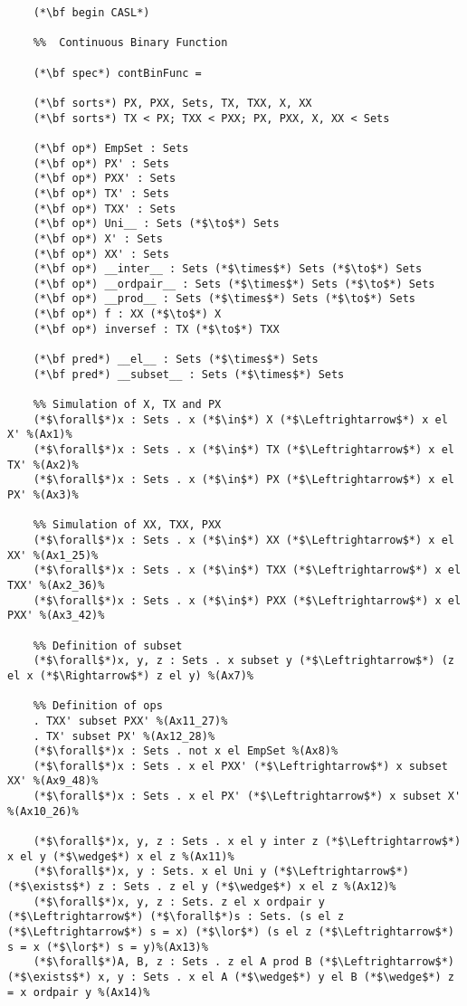 \documentclass{standalone}
\begin{document}
\begin{lstlisting}
	(*\bf begin CASL*)
	
	%%  Continuous Binary Function
	
	(*\bf spec*) contBinFunc =
	
	(*\bf sorts*) PX, PXX, Sets, TX, TXX, X, XX
	(*\bf sorts*) TX < PX; TXX < PXX; PX, PXX, X, XX < Sets
	
	(*\bf op*) EmpSet : Sets
	(*\bf op*) PX' : Sets
	(*\bf op*) PXX' : Sets
	(*\bf op*) TX' : Sets
	(*\bf op*) TXX' : Sets
	(*\bf op*) Uni__ : Sets (*$\to$*) Sets
	(*\bf op*) X' : Sets
	(*\bf op*) XX' : Sets
	(*\bf op*) __inter__ : Sets (*$\times$*) Sets (*$\to$*) Sets
	(*\bf op*) __ordpair__ : Sets (*$\times$*) Sets (*$\to$*) Sets
	(*\bf op*) __prod__ : Sets (*$\times$*) Sets (*$\to$*) Sets
	(*\bf op*) f : XX (*$\to$*) X
	(*\bf op*) inversef : TX (*$\to$*) TXX
	
	(*\bf pred*) __el__ : Sets (*$\times$*) Sets
	(*\bf pred*) __subset__ : Sets (*$\times$*) Sets
	
	%% Simulation of X, TX and PX
	(*$\forall$*)x : Sets . x (*$\in$*) X (*$\Leftrightarrow$*) x el X' %(Ax1)%
	(*$\forall$*)x : Sets . x (*$\in$*) TX (*$\Leftrightarrow$*) x el TX' %(Ax2)%
	(*$\forall$*)x : Sets . x (*$\in$*) PX (*$\Leftrightarrow$*) x el PX' %(Ax3)%
	
	%% Simulation of XX, TXX, PXX
	(*$\forall$*)x : Sets . x (*$\in$*) XX (*$\Leftrightarrow$*) x el XX' %(Ax1_25)%
	(*$\forall$*)x : Sets . x (*$\in$*) TXX (*$\Leftrightarrow$*) x el TXX' %(Ax2_36)%
	(*$\forall$*)x : Sets . x (*$\in$*) PXX (*$\Leftrightarrow$*) x el PXX' %(Ax3_42)%
	
	%% Definition of subset
	(*$\forall$*)x, y, z : Sets . x subset y (*$\Leftrightarrow$*) (z el x (*$\Rightarrow$*) z el y) %(Ax7)%
	
	%% Definition of ops
	. TXX' subset PXX' %(Ax11_27)%
	. TX' subset PX' %(Ax12_28)%
	(*$\forall$*)x : Sets . not x el EmpSet %(Ax8)%
	(*$\forall$*)x : Sets . x el PXX' (*$\Leftrightarrow$*) x subset XX' %(Ax9_48)%
	(*$\forall$*)x : Sets . x el PX' (*$\Leftrightarrow$*) x subset X' %(Ax10_26)%
	
	(*$\forall$*)x, y, z : Sets . x el y inter z (*$\Leftrightarrow$*) x el y (*$\wedge$*) x el z %(Ax11)%
	(*$\forall$*)x, y : Sets. x el Uni y (*$\Leftrightarrow$*) (*$\exists$*) z : Sets . z el y (*$\wedge$*) x el z %(Ax12)%
	(*$\forall$*)x, y, z : Sets. z el x ordpair y (*$\Leftrightarrow$*) (*$\forall$*)s : Sets. (s el z (*$\Leftrightarrow$*) s = x) (*$\lor$*) (s el z (*$\Leftrightarrow$*) s = x (*$\lor$*) s = y)%(Ax13)%
	(*$\forall$*)A, B, z : Sets . z el A prod B (*$\Leftrightarrow$*) (*$\exists$*) x, y : Sets . x el A (*$\wedge$*) y el B (*$\wedge$*) z = x ordpair y %(Ax14)%
	

\end{lstlisting}
\end{document}

